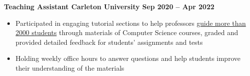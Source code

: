 \textbf{Teaching Assistant \hfill Carleton University \hfill Sep 2020 -- Apr 2022}\par

\begin{itemize}
	\item Participated in engaging tutorial sections to help professors \ul{guide more than 2000 students} through materials of Computer Science courses, graded and provided detailed feedback for students’ assignments and tests
	\item Holding weekly office hours to answer questions and help students improve their understanding of the materials
\end{itemize}\par